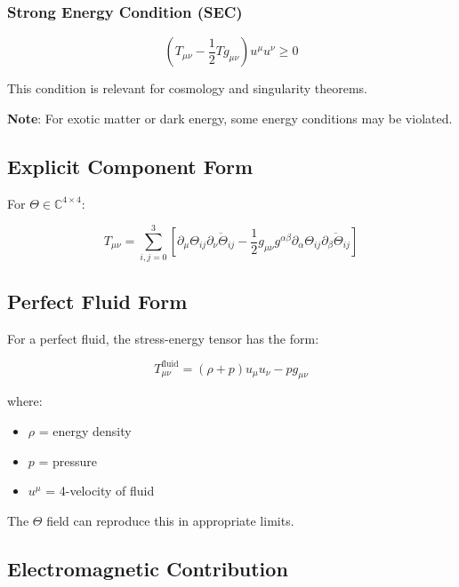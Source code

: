 \subsubsection{Strong Energy Condition (SEC)}

\begin{equation}
\label{eq:canonical:sec}
\left(T_{\mu\nu} - \frac{1}{2} T g_{\mu\nu}\right) u^\mu u^\nu \geq 0
\end{equation}

This condition is relevant for cosmology and singularity theorems.

\textbf{Note}: For exotic matter or dark energy, some energy conditions may be violated.

\subsection{Explicit Component Form}

For $\Theta \in \mathbb{C}^{4 \times 4}$:

\begin{equation}
\label{eq:canonical:stress_explicit}
T_{\mu\nu} = \sum_{i,j=0}^{3} \left[\partial_\mu\Theta_{ij} \overline{\partial_\nu\Theta_{ij}} - \frac{1}{2} g_{\mu\nu} g^{\alpha\beta} \partial_\alpha\Theta_{ij} \overline{\partial_\beta\Theta_{ij}}\right]
\end{equation}

\subsection{Perfect Fluid Form}

For a perfect fluid, the stress-energy tensor has the form:

\begin{equation}
\label{eq:canonical:perfect_fluid}
T_{\mu\nu}^{\text{fluid}} = (\rho + p) u_\mu u_\nu - p g_{\mu\nu}
\end{equation}

where:
\begin{itemize}
    \item $\rho$ = energy density
    \item $p$ = pressure
    \item $u^\mu$ = 4-velocity of fluid
\end{itemize}

The $\Theta$ field can reproduce this in appropriate limits.

\subsection{Electromagnetic Contribution}

